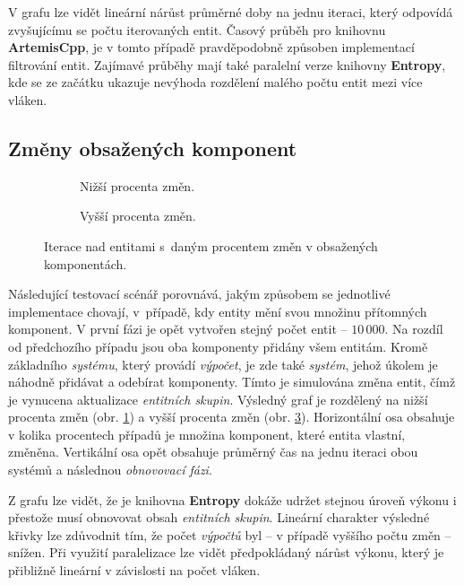 V grafu lze vidět lineární nárůst průměrné doby na jednu iteraci, který odpovídá zvyšujícímu se počtu iterovaných entit. Časový průběh pro knihovnu \textbf{ArtemisCpp}, je v tomto případě pravděpodobně způsoben implementací filtrování entit. Zajímavé průběhy mají také paralelní verze knihovny \textbf{Entropy}, kde se ze začátku ukazuje nevýhoda rozdělení malého počtu entit mezi více vláken. 

\subsection{Změny obsažených komponent}

\begin{figure}[H]
	\centering
	\begin{subfigure}[b]{0.49\textwidth}
		\caption{Nižší procenta změn.}\label{Fig:EVALAdvMovSysLow}
	\end{subfigure}
	\begin{subfigure}[b]{0.49\textwidth}
		\caption{Vyšší procenta změn.}\label{Fig:EVALAdvMovSysHigh}
	\end{subfigure}
	\caption{Iterace nad entitami s~daným procentem změn v obsažených komponentách.}
\end{figure}

Následující testovací scénář porovnává, jakým způsobem se jednotlivé implementace chovají, v~případě, kdy entity mění svou množinu přítomných komponent. V první fázi je opět vytvořen stejný počet entit -- $10\,000$. Na rozdíl od předchozího případu jsou oba komponenty přidány všem entitám. Kromě základního \emph{systému}, který provádí \emph{výpočet}, je zde také \emph{systém}, jehož úkolem je náhodně přidávat a odebírat komponenty. Tímto je simulována změna entit, čímž je vynucena aktualizace \emph{entitních skupin}. Výsledný graf je rozdělený na nižší procenta změn (obr. \ref{Fig:EVALAdvMovSysLow}) a vyšší procenta změn (obr. \ref{Fig:EVALAdvMovSysHigh}). Horizontální osa obsahuje v kolika procentech případů je množina komponent, které entita vlastní, změněna. Vertikální osa opět obsahuje průměrný čas na jednu iteraci obou systémů a následnou \emph{obnovovací fázi}.

Z grafu lze vidět, že je knihovna \textbf{Entropy} dokáže udržet stejnou úroveň výkonu i přestože musí obnovovat obsah \emph{entitních skupin}. Lineární charakter výsledné křivky lze zdůvodnit tím, že počet \emph{výpočtů} byl -- v případě vyššího počtu změn -- snížen. Při využití paralelizace lze vidět předpokládaný nárůst výkonu, který je přibližně lineární v závislosti na počet vláken.

